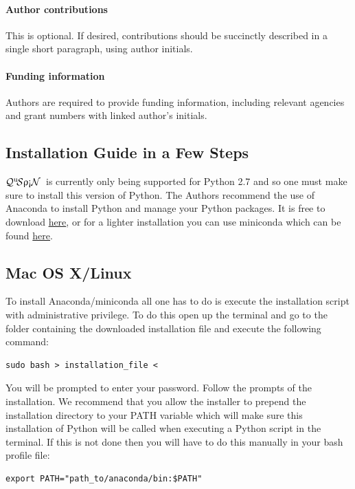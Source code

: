 \documentclass{SciPost}
\newcommand\0{\scalebox{-1}[1]{0}}
\newcommand{\qspin}{$\mathcal{Q}^{\mathrm{u}}\!\mathcal{S}\uprho\mathrm{\text{\textexclamdown}}\mathcal{N}$}
\begin{document}
\paragraph{Author contributions}
This is optional. If desired, contributions should be succinctly described in a single short paragraph, using author initials.

\paragraph{Funding information}
Authors are required to provide funding information, including relevant agencies and grant numbers with linked author's initials.


\begin{appendix}

\section{Installation Guide in a Few Steps}
\label{app:install}

\qspin\ is currently only being supported for Python 2.7 and so one must make sure to install this version of Python. The Authors recommend the use of Anaconda to install Python and manage your Python packages. It is free to download \href{https://www.continuum.io/downloads}{here}, or for a lighter installation you can use miniconda which can be found \href{http://conda.pydata.org/miniconda.html}{here}. 

\subsection{Mac OS X/Linux}
To install Anaconda/miniconda all one has to do is execute the installation script with administrative privilege. To do this open up the terminal and go to the folder containing the downloaded installation file and execute the following command: 
\begin{lstlisting}[numbers=none]
sudo bash > installation_file <
\end{lstlisting}
You will be prompted to enter your password. Follow the prompts of the installation. We recommend that you allow the installer to prepend the installation directory to your PATH variable which will make sure this installation of Python will be called when executing a Python script in the terminal. If this is not done then you will have to do this manually in your bash profile file:
\begin{lstlisting}[numbers=none]
export PATH="path_to/anaconda/bin:$PATH"
\end{lstlisting}


\end{appendix}
\end{document}
